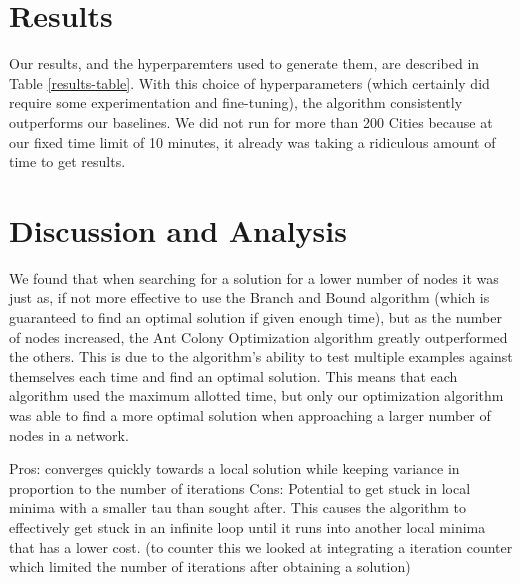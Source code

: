 \section{Results}
Our results, and the hyperparemters used to generate them, are described in Table \ref{results-table}. With this
choice of hyperparameters (which certainly did require some experimentation and fine-tuning), the
algorithm consistently outperforms our baselines. We did not run for more than 200 Cities because
at our fixed time limit of 10 minutes, it already was taking a ridiculous amount of time to get results.

\section{Discussion and Analysis}
We found that when searching for a solution for a lower number of nodes it was just as, if not more 
effective to use the Branch and Bound algorithm (which is guaranteed to find an optimal solution if
given enough time), but as the number of nodes increased, the Ant Colony Optimization algorithm greatly 
outperformed the others. This is due to the algorithm's ability to
test multiple examples against themselves each time and find an optimal solution. This means that
each algorithm used the maximum allotted time, but only our optimization algorithm was able to find 
a more optimal solution when approaching a larger number of nodes in a network. 

Pros: converges quickly towards a local solution while keeping variance in proportion to the number of iterations
Cons: Potential to get stuck in local minima with a smaller tau than sought after. This causes
the algorithm to effectively get stuck in an infinite loop until it runs into another local minima
that has a lower cost. (to counter this we looked at integrating a iteration counter which limited
the number of iterations after obtaining a solution)

